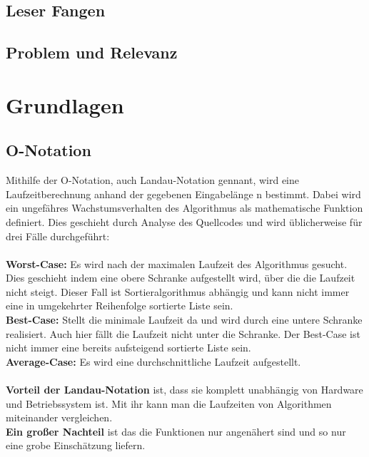 \documentclass{article}
\begin{document}
\subsection{Leser Fangen}
\subsection{Problem und Relevanz}

\section{Grundlagen}
\subsection{O-Notation}
Mithilfe der O-Notation, auch Landau-Notation gennant, wird eine Laufzeitberechnung anhand der gegebenen Eingabelänge n bestimmt. Dabei wird ein ungefähres Wachstumsverhalten des Algorithmus als mathematische Funktion definiert. Dies geschieht durch Analyse des Quellcodes und wird üblicherweise für drei Fälle durchgeführt: \cite{ONotation}\\ \\
\textbf {Worst-Case:} Es wird nach der maximalen Laufzeit des Algorithmus gesucht. Dies geschieht indem eine obere Schranke aufgestellt wird, über die die Laufzeit nicht steigt. Dieser Fall ist Sortieralgorithmus abhängig und kann nicht immer eine in umgekehrter Reihenfolge sortierte Liste sein.   \\
\textbf {Best-Case:} Stellt die minimale Laufzeit da und wird durch eine untere Schranke realisiert. Auch hier fällt die Laufzeit nicht unter die Schranke. Der Best-Case ist nicht immer eine bereits aufsteigend sortierte Liste sein.\\
\textbf {Average-Case:} Es wird eine durchschnittliche Laufzeit aufgestellt. \\ \\
\textbf{Vorteil der Landau-Notation} ist, dass sie komplett unabhängig von Hardware und Betriebssystem ist. Mit ihr kann man die Laufzeiten von Algorithmen miteinander vergleichen.\\
\textbf{Ein großer Nachteil} ist das die Funktionen nur angenähert sind und so nur eine grobe Einschätzung liefern.%
\end{document}
